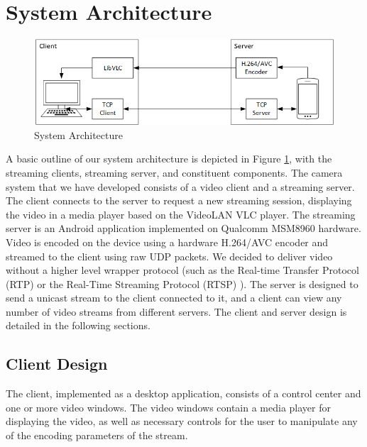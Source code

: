 \documentclass[a4paper,12pt]{article}
\begin{document}

\section{System Architecture}
\label{sec:Architecture}
\begin{figure}[h]
\centering
\includegraphics[width=0.8\linewidth]{SystemArchitecture.png}
\caption{System Architecture}
\label{fig:SystemArchitecture}
\end{figure}

A basic outline of our system architecture is depicted in Figure \ref{fig:SystemArchitecture}, with the streaming clients, streaming server, and constituent components. The camera system that we have developed consists of a video client and a streaming server. The client connects to the server to request a new streaming session, displaying the video in a media player based on the VideoLAN VLC player. The streaming server is an Android application implemented on Qualcomm MSM8960 hardware. Video is encoded on the device using a hardware H.264/AVC encoder and streamed to the client using raw UDP packets. We decided to deliver video without a higher level wrapper protocol (such as the Real-time Transfer Protocol (RTP) \cite{RTP} or the Real-Time Streaming Protocol (RTSP) \cite{RTSP}). The server is designed to send a unicast stream to the client connected to it, and a client can view any number of video streams from different servers. The client and server design is detailed in the following sections.

\subsection{Client Design}

The client, implemented as a desktop application, consists of a control center and one or more video windows. The video windows contain a media player for displaying the video, as well as necessary controls for the user to manipulate any of the encoding parameters of the stream. 
\end{document}
